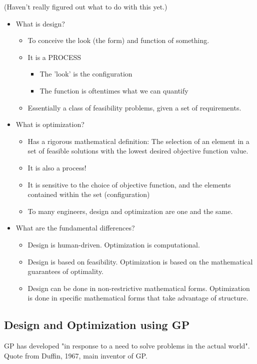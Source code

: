 \documentclass{aiaa-pretty}
\begin{document}
(Haven't really figured out what to do with this yet.)

\begin{itemize}
\item What is design? 
\begin{itemize}
\item To conceive the look (the form) and function of something. 
\item It is a PROCESS
\begin{itemize}
	\item The 'look' is the configuration
	\item The function is oftentimes what we can quantify
\end{itemize}
\item Essentially a class of feasibility problems, given a set of requirements. 
\end{itemize}
\item What is optimization?
\begin{itemize}
\item Has a rigorous mathematical definition: The selection of an element in a set of feasible solutions with the lowest desired objective function value. 
\item It is also a process!
\item It is sensitive to the choice of objective function, and the elements contained within the set (configuration)
\item To many engineers, design and optimization are one and the same. 
\end{itemize}
\item What are the fundamental differences? 
\begin{itemize}
\item Design is human-driven. Optimization is computational. 
\item Design is based on feasibility. Optimization is based on the mathematical guarantees of optimality. 
\item Design can be done in non-restrictive mathematical forms. Optimization is done in specific mathematical forms that take advantage of structure. 
\end{itemize}
\end{itemize}
\subsection{Design and Optimization using \gls{GP}}

\gls{GP} has developed "in response to a need to solve problems in the actual world".~\cite{duffingp} Quote from Duffin, 1967, main inventor of GP. 
\end{document}
